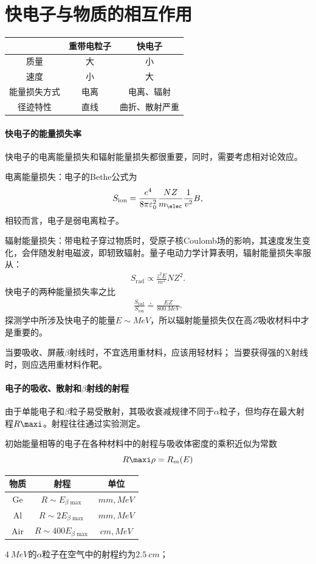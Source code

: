 \section{快电子与物质的相互作用}

\begin{center}
	\begin{tabular}{ccc}
		\toprule
		&重带电粒子&快电子\\
		\midrule
		质量&大&小\\
		速度&小&大\\
		能量损失方式&电离&电离、辐射\\
		径迹特性&直线&曲折、散射严重\\
		\bottomrule
	\end{tabular}
\end{center}
\paragraph{快电子的能量损失率}
快电子的电离能量损失和辐射能量损失都很重要，同时，需要考虑相对论效应。

电离能量损失：电子的Bethe公式为
\begin{align}
	S_{\mathrm{ion}}=\frac{e^4}{8\pi\varepsilon_0^2}\frac{NZ}{m_\elec}\frac{1}{v^2}B,
\end{align}
相较而言，电子是弱电离粒子。

辐射能量损失：带电粒子穿过物质时，受原子核Coulomb场的影响，其速度发生变化，会伴随发射电磁波，即轫致辐射。量子电动力学计算表明，辐射能量损失率服从：
\begin{align}
	S_{\mathrm{rad}}\propto\frac{z^2E}{m^2}NZ^2.
\end{align}
快电子的两种能量损失率之比
\begin{align}
	\frac{S_{\mathrm{rad}}}{S_{\mathrm{ion}}}\doteq\frac{EZ}{\SI{800}{MeV}}.
\end{align}
探测学中所涉及快电子的能量$E\sim\si{MeV}$，所以辐射能量损失仅在高$Z$吸收材料中才是重要的。

当要吸收、屏蔽$\beta$射线时，不宜选用重材料，应该用轻材料；
当要获得强的X射线时，则应选用重材料作靶。

\paragraph{电子的吸收、散射和$\beta$射线的射程}
由于单能电子和$\beta$粒子易受散射，其吸收衰减规律不同于$\alpha$粒子，但均存在最大射程$R\maxi$。射程往往通过实验测定。

初始能量相等的电子在各种材料中的射程与吸收体密度的乘积近似为常数
\[
	R\maxi \rho=R_m(E)
\]
\begin{center}
	\begin{tabular}{ccc}
		\toprule
		物质&射程&单位\\
		\midrule
		Ge&$R\sim E_{\beta\max{}}$&$\si{mm},\si{MeV}$\\
		Al&$R\sim 2E_{\beta\max{}}$&$\si{mm},\si{MeV}$\\
		Air&$R\sim 400E_{\beta\max{}}$&$\si{cm},\si{MeV}$\\
		\bottomrule
	\end{tabular}
\end{center}
$\SI{4}{MeV}$的$\alpha$粒子在空气中的射程约为$\SI{2.5}{cm}$；

